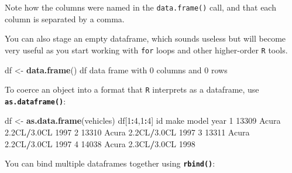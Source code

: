 \documentclass[
]{book}
\newenvironment{Shaded}{\begin{snugshade}}{\end{snugshade}}
\newcommand{\DecValTok}[1]{\textcolor[rgb]{0.00,0.00,0.81}{#1}}
\newcommand{\FloatTok}[1]{\textcolor[rgb]{0.00,0.00,0.81}{#1}}
\newcommand{\KeywordTok}[1]{\textcolor[rgb]{0.13,0.29,0.53}{\textbf{#1}}}
\newcommand{\NormalTok}[1]{#1}
\newcommand{\OperatorTok}[1]{\textcolor[rgb]{0.81,0.36,0.00}{\textbf{#1}}}
\newcommand{\StringTok}[1]{\textcolor[rgb]{0.31,0.60,0.02}{#1}}
\begin{document}
Note how the columns were named in the \texttt{data.frame()} call, and that each column is separated by a comma.

You can also stage an empty dataframe, which sounds useless but will become very useful as you start working with \texttt{for} loops and other higher-order \texttt{R} tools.

\begin{Shaded}
\begin{Highlighting}[]
\NormalTok{df <-}\StringTok{ }\KeywordTok{data.frame}\NormalTok{()}
\NormalTok{df}
\NormalTok{data frame with }\DecValTok{0}\NormalTok{ columns and }\DecValTok{0}\NormalTok{ rows}
\end{Highlighting}
\end{Shaded}

To coerce an object into a format that \texttt{R} interprets as a dataframe, use \textbf{\texttt{as.dataframe()}}:

\begin{Shaded}
\begin{Highlighting}[]
\NormalTok{df <-}\StringTok{ }\KeywordTok{as.data.frame}\NormalTok{(vehicles)}
\NormalTok{df[}\DecValTok{1}\OperatorTok{:}\DecValTok{4}\NormalTok{,}\DecValTok{1}\OperatorTok{:}\DecValTok{4}\NormalTok{]}
\NormalTok{     id  make       model year}
\DecValTok{1} \DecValTok{13309}\NormalTok{ Acura }\FloatTok{2.2}\NormalTok{CL}\OperatorTok{/}\FloatTok{3.0}\NormalTok{CL }\DecValTok{1997}
\DecValTok{2} \DecValTok{13310}\NormalTok{ Acura }\FloatTok{2.2}\NormalTok{CL}\OperatorTok{/}\FloatTok{3.0}\NormalTok{CL }\DecValTok{1997}
\DecValTok{3} \DecValTok{13311}\NormalTok{ Acura }\FloatTok{2.2}\NormalTok{CL}\OperatorTok{/}\FloatTok{3.0}\NormalTok{CL }\DecValTok{1997}
\DecValTok{4} \DecValTok{14038}\NormalTok{ Acura }\FloatTok{2.3}\NormalTok{CL}\OperatorTok{/}\FloatTok{3.0}\NormalTok{CL }\DecValTok{1998}
\end{Highlighting}
\end{Shaded}

You can bind multiple dataframes together using \textbf{\texttt{rbind()}}:
\end{document}
